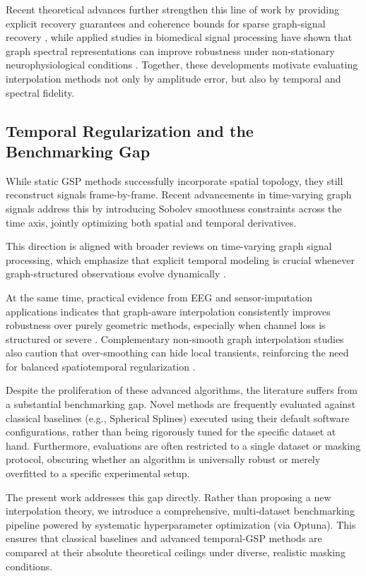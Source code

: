 Recent theoretical advances further strengthen this line of work by providing explicit recovery guarantees and coherence bounds for sparse graph-signal recovery \cite{morgenstern_theoretical_2025}, while applied studies in biomedical signal processing have shown that graph spectral representations can improve robustness under non-stationary neurophysiological conditions \cite{miri_spectral_2024}. Together, these developments motivate evaluating interpolation methods not only by amplitude error, but also by temporal and spectral fidelity.

\subsection{Temporal Regularization and the Benchmarking Gap}
While static GSP methods successfully incorporate spatial topology, they still reconstruct signals frame-by-frame. Recent advancements in time-varying graph signals \cite{giraldo2022} address this by introducing Sobolev smoothness constraints across the time axis, jointly optimizing both spatial and temporal derivatives. 

This direction is aligned with broader reviews on time-varying graph signal processing, which emphasize that explicit temporal modeling is crucial whenever graph-structured observations evolve dynamically \cite{yan_signal_2026, krishnan_learning_2026}.

At the same time, practical evidence from EEG and sensor-imputation applications indicates that graph-aware interpolation consistently improves robustness over purely geometric methods, especially when channel loss is structured or severe \cite{weinstein_imputing_2023, jiang_graph-based_2021}. Complementary non-smooth graph interpolation studies also caution that over-smoothing can hide local transients, reinforcing the need for balanced spatiotemporal regularization \cite{mazarguil_non-smooth_2022}.

Despite the proliferation of these advanced algorithms, the literature suffers from a substantial benchmarking gap. Novel methods are frequently evaluated against classical baselines (e.g., Spherical Splines) executed using their default software configurations, rather than being rigorously tuned for the specific dataset at hand. Furthermore, evaluations are often restricted to a single dataset or masking protocol, obscuring whether an algorithm is universally robust or merely overfitted to a specific experimental setup. 

The present work addresses this gap directly. Rather than proposing a new interpolation theory, we introduce a comprehensive, multi-dataset benchmarking pipeline powered by systematic hyperparameter optimization (via Optuna). This ensures that classical baselines and advanced temporal-GSP methods are compared at their absolute theoretical ceilings under diverse, realistic masking conditions.

